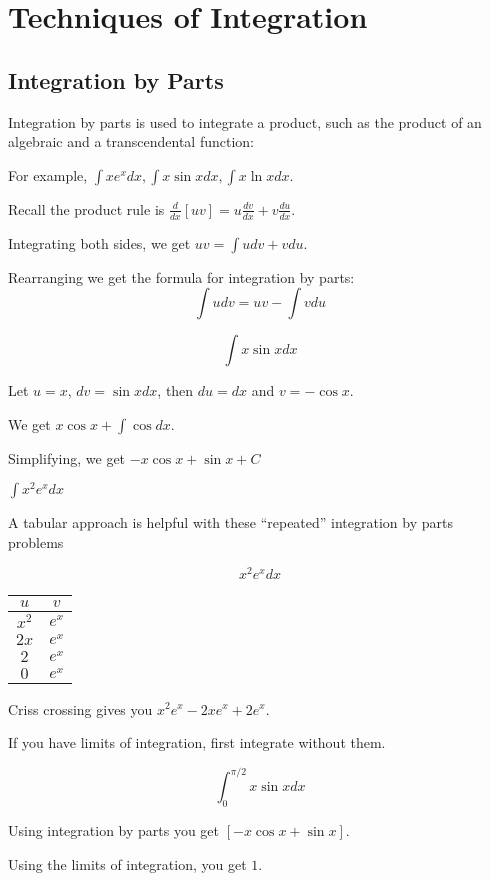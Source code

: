 \documentclass[../bccalc.tex]{subfiles}
\begin{document}
\chapter{Techniques of Integration}
\section{Integration by Parts}
Integration by parts is used to integrate a product, such as the product of an algebraic and a transcendental function:

For example, $\int xe^x dx, \int x\sin x dx, \int x\ln x dx$.

Recall the product rule is $\frac{d}{dx}[uv]=u\frac{dv}{dx}+v\frac{du}{dx}$.

Integrating both sides, we get $uv=\int u dv + vdu$.

Rearranging we get the formula for integration by parts:
\[ \int u dv = uv-\int v du \]

\begin{example}
    \[ \int x\sin x dx \]

    Let $u=x$, $dv= \sin x dx$, then $du=dx$ and $v=-\cos x$.

    We get $x\cos x+\int \cos dx$.

    Simplifying, we get $-x\cos x + \sin x+C$
\end{example}

\ex $\int x^2e^x dx$

A tabular approach is helpful with these ``repeated'' integration by parts problems 
\begin{example}
    \[ x^2e^x dx \]
\begin{center}
\begin{tabular}{c|c}
    $u$ & $v$ \\ \hline
    $x^2$ & $e^x$ \\
    $2x$  & $e^x$ \\
    $2$   & $e^x$ \\
    $0$   & $e^x$
\end{tabular}
\end{center}
    

    Criss crossing gives you $x^2e^x - 2xe^x+2e^x$.
\end{example}

If you have limits of integration, first integrate without them.
\begin{example}
    \[ \int_0^{\pi/2}x\sin x dx \]

    Using integration by parts you get $[-x\cos x+\sin x]$.

    Using the limits of integration, you get $1$.
\end{example}
\end{document}
